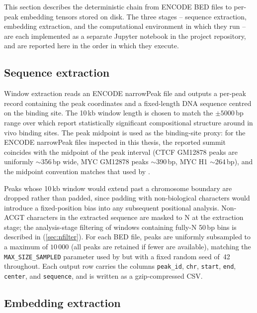 This section describes the deterministic chain from ENCODE BED files to per-peak embedding tensors stored on disk.
The three stages -- sequence extraction, embedding extraction, and the computational environment in which they run -- are each implemented as a separate Jupyter notebook in the project repository, and are reported here in the order in which they execute.

\subsection{Sequence extraction}
\label{sec:windows}

Window extraction reads an ENCODE narrowPeak file and outputs a per-peak record containing the peak coordinates and a fixed-length DNA sequence centred on the binding site.
The 10\,kb window length is chosen to match the $\pm 5000$\,bp range over which \citet{faltejskovaNonconsensusFlankingSequence2026a} report statistically significant compositional structure around in vivo binding sites.
The peak midpoint is used as the binding-site proxy: for the ENCODE narrowPeak files inspected in this thesis, the reported summit coincides with the midpoint of the peak interval (CTCF GM12878 peaks are uniformly $\sim$356\,bp wide, MYC GM12878 peaks $\sim$390\,bp, MYC H1 $\sim$264\,bp), and the midpoint convention matches that used by \citet{faltejskovaNonconsensusFlankingSequence2026a}.

Peaks whose 10\,kb window would extend past a chromosome boundary are dropped rather than padded, since padding with non-biological characters would introduce a fixed-position bias into any subsequent positional analysis.
Non-ACGT characters in the extracted sequence are masked to N at the extraction stage; the analysis-stage filtering of windows containing fully-N 50\,bp bins is described in (\ref{sec:nfilter}).
For each BED file, peaks are uniformly subsampled to a maximum of $10\,000$ (all peaks are retained if fewer are available), matching the \texttt{MAX\_SIZE\_SAMPLED} parameter used by \citet{faltejskovaNonconsensusFlankingSequence2026a} but with a fixed random seed of~42 throughout.
Each output row carries the columns \texttt{peak\_id}, \texttt{chr}, \texttt{start}, \texttt{end}, \texttt{center}, and \texttt{sequence}, and is written as a gzip-compressed CSV.

\subsection{Embedding extraction}
\label{sec:embeddings}

